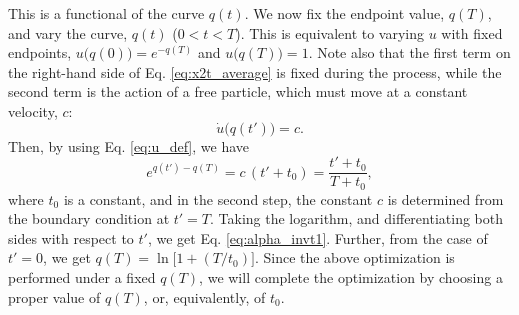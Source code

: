 \documentclass[reprint, superscriptaddress, floatfix]{revtex4-1}
\begin{document}
This is a functional of the curve $q(t)$.
%
We now fix the endpoint value, $q(T)$,
and vary the curve, $q(t)$ ($0 < t < T$).
%
This is equivalent to varying $u$
with fixed endpoints,
$u\bigl( q(0) \bigr)  = e^{- q(T)}$
and
$u\bigl( q(T) \bigr) = 1$.
%
Note also that the first term on the right-hand side
of Eq. \eqref{eq:x2t_average} is fixed during
the process,
while the second term is the action of a free particle,
which must move at a constant velocity, $c$:
%
%
%
%
\begin{equation}
  \dot u\bigl( q(t') \bigr) = c
  .
\label{eq:dudt_const}
\end{equation}
%
Then, by using Eq. \eqref{eq:u_def}, we have
$$
e^{ q(t') - q(T) }
=
c \, (t' + t_0)
=
\frac{ t' + t_0 }
     { T  + t_0 }
,
$$
where $t_0$ is a constant,
and in the second step,
the constant $c$ is determined
from the boundary condition at $t' = T$.
%
Taking the logarithm,
and differentiating both sides
with respect to $t'$,
we get Eq. \eqref{eq:alpha_invt1}.
%
Further, from the case of $t' = 0$,
we get $q(T) = \ln\bigl[1 + (T/t_0)\bigr]$.
%
Since the above optimization is performed
under a fixed $q(T)$,
we will complete the optimization
by choosing a proper value of $q(T)$,
or, equivalently, of $t_0$.
\end{document}

